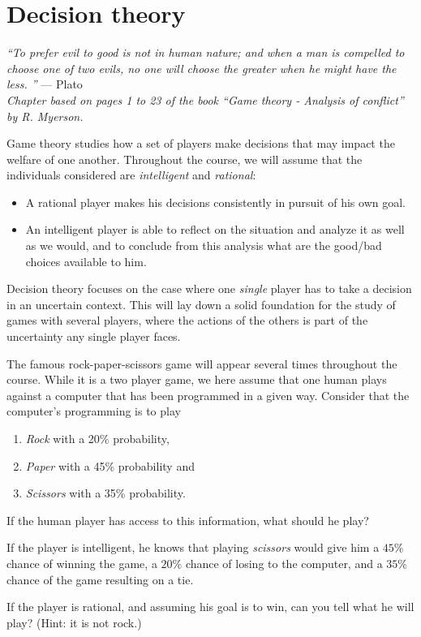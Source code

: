 \ifx \globalmark \undefined %
		


\else 
	
\fi



\chapter{Decision theory}
{\large{\itshape
``To prefer evil to good is not in human nature; and when a man is compelled to choose one of two evils, no one will choose the greater when he might have the less.
''} --- Plato\\
}
{\small{\itshape
Chapter based on pages 1 to 23 of the book  ``Game theory - Analysis of conflict'' by R. Myerson.}\\
}
\label{chap:Decision}



Game theory studies how a set of players make decisions that may impact the welfare of one another.  
Throughout the course, we will assume that the individuals considered are \emph{intelligent} and \emph{rational}:
\begin{itemize}
\item A rational player makes his decisions consistently in pursuit of his own goal.
\item An intelligent player is able to reflect on the situation and analyze it as well as we would, and to conclude from this analysis what are the good/bad choices available to him.
\end{itemize} 
Decision theory focuses on the case where one \emph{single} player has to take a decision in an uncertain context. This will lay down a solid foundation for the study of games with several players, where the actions of the others is part of the uncertainty any single player faces. 

\begin{example}
\label{ch1:ex1}
The famous rock-paper-scissors game will appear several times throughout the course. While it is a two player game, we here assume that one human plays against a computer that has been programmed in a given way.
Consider that the computer's programming is to play
\begin{enumerate}
\item \emph{Rock} with a 20\% probability,
\item \emph{Paper} with a 45\% probability and
\item \emph{Scissors} with a 35\% probability.
\end{enumerate} 
If the human player has access to this information, what should he play?

If the player is intelligent, he knows that playing \emph{scissors} would give him a $45\%$ chance of winning the game, a $20\%$ chance of losing to the computer, and a $35\%$ chance of the game resulting on a tie.

If the player is rational, and assuming his goal is to win, can you tell what he will play? (Hint: it is not rock.)
\end{example}

